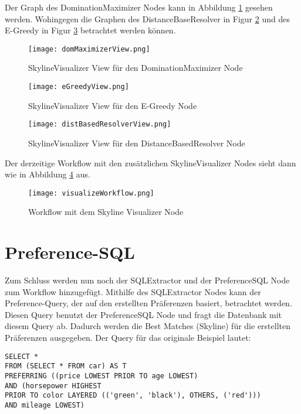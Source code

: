 Der Graph des DominationMaximizer Nodes kann in Abbildung \ref{img:domMaximizerView} gesehen werden. Wohingegen die Graphen des DistanceBaseResolver in Figur \ref{img:eGreedyView} und des E-Greedy in Figur \ref{img:distBasedResolverView} betrachtet werden können. 

\begin{figure}[H]
	\centering
	\texttt{[image: domMaximizerView.png]}
	\caption{SkylineVisualizer View für den DominationMaximizer Node}
	\label{img:domMaximizerView}
	
\end{figure} 
	\begin{figure}[H]
	\centering
	\texttt{[image: eGreedyView.png]}
	\caption{SkylineVisualizer View für den E-Greedy Node}
	\label{img:eGreedyView}
\end{figure} 

\begin{figure}[H]
	\centering
	\texttt{[image: distBasedResolverView.png]}
	\caption{SkylineVisualizer View für den DistanceBasedResolver Node}
	\label{img:distBasedResolverView}
\end{figure} 

Der derzeitige Workflow mit den zusätzlichen SkylineVisualizer Nodes sieht dann wie in Abbildung \ref{img:visualizeWorkflow} aus.

\begin{figure}[H]
	\centering
	\texttt{[image: visualizeWorkflow.png]}
	\caption{Workflow mit dem Skyline Visualizer Node}
	\label{img:visualizeWorkflow}
\end{figure} 

\section{Preference-SQL}
\label{ch:Evaluierung:sec:prefSQL}
Zum Schluss werden nun noch der SQLExtractor und der PreferenceSQL Node zum Workflow hinzugefügt. Mithilfe des SQLExtractor Nodes kann der Preference-Query, der auf den erstellten Präferenzen basiert, betrachtet werden. Diesen Query benutzt der PreferenceSQL Node und fragt die Datenbank mit diesem Query ab. Dadurch werden die Best Matches (Skyline) für die erstellten Präferenzen ausgegeben. Der Query für das originale Beispiel lautet:
 
\begin{verbatim}
SELECT * 
FROM (SELECT * FROM car) AS T 
PREFERRING ((price LOWEST PRIOR TO age LOWEST) 
AND (horsepower HIGHEST 
PRIOR TO color LAYERED (('green', 'black'), OTHERS, ('red')))
AND mileage LOWEST)
\end{verbatim}

